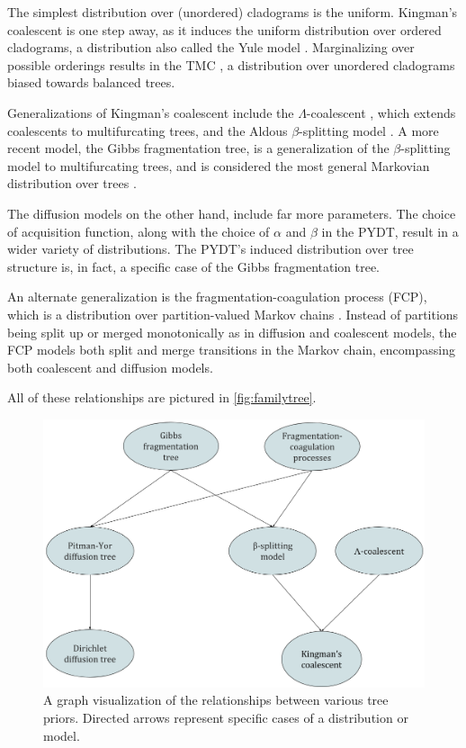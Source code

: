 The simplest distribution over (unordered) cladograms
is the uniform.
Kingman's coalescent is one step away,
as it
induces the uniform distribution
over ordered cladograms,
a distribution also called
the Yule model \citep{Harding1971}.
Marginalizing over possible orderings
results in the TMC \citep{Boyles2012}, a distribution over unordered cladograms biased towards balanced trees.

Generalizations of Kingman's coalescent
include the $\Lambda$-coalescent \citep{Pitman1999},
which extends coalescents to multifurcating trees,
and the Aldous $\beta$-splitting model \citep{Aldous1996}.
A more recent model, the Gibbs fragmentation tree,
is a generalization of the $\beta$-splitting model
to multifurcating trees,
and is considered the most general Markovian distribution over trees \citep{McCullagh2008}.

The diffusion models on the other hand,
include far more parameters.
The choice of acquisition function,
along with the choice of $\alpha$ and $\beta$ in the PYDT,
result in a wider variety of distributions.
The PYDT's induced distribution over tree
structure is, in fact, a specific case
of the Gibbs fragmentation tree.

An alternate generalization is the fragmentation-coagulation process (FCP),
which is a distribution over partition-valued
Markov chains \citep{Teh2011}.
Instead of partitions being
split up or merged monotonically as in
diffusion and coalescent models, the 
FCP models both split and merge
transitions in the Markov chain, encompassing
both coalescent and diffusion models.

All of these relationships are pictured in \autoref{fig:familytree}.

\begin{figure}[H]
  \includegraphics[width=\textwidth]{img/trees/FamilyTree}
  \caption{A graph visualization of the relationships between various
  tree priors. Directed arrows represent
  specific cases of a distribution or model.}
\label{fig:familytree}
\end{figure}

